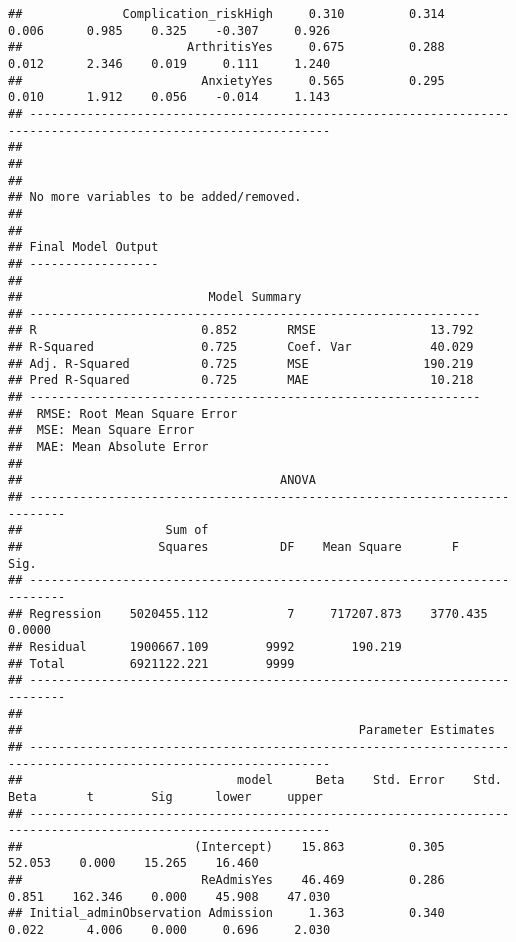 \documentclass[
]{article}
\begin{document}
\begin{verbatim}
##              Complication_riskHigh     0.310         0.314        0.006      0.985    0.325    -0.307     0.926 
##                       ArthritisYes     0.675         0.288        0.012      2.346    0.019     0.111     1.240 
##                         AnxietyYes     0.565         0.295        0.010      1.912    0.056    -0.014     1.143 
## ----------------------------------------------------------------------------------------------------------------
## 
## 
## 
## No more variables to be added/removed.
## 
## 
## Final Model Output 
## ------------------
## 
##                          Model Summary                          
## ---------------------------------------------------------------
## R                       0.852       RMSE                13.792 
## R-Squared               0.725       Coef. Var           40.029 
## Adj. R-Squared          0.725       MSE                190.219 
## Pred R-Squared          0.725       MAE                 10.218 
## ---------------------------------------------------------------
##  RMSE: Root Mean Square Error 
##  MSE: Mean Square Error 
##  MAE: Mean Absolute Error 
## 
##                                    ANOVA                                    
## ---------------------------------------------------------------------------
##                    Sum of                                                  
##                   Squares          DF    Mean Square       F          Sig. 
## ---------------------------------------------------------------------------
## Regression    5020455.112           7     717207.873    3770.435    0.0000 
## Residual      1900667.109        9992        190.219                       
## Total         6921122.221        9999                                      
## ---------------------------------------------------------------------------
## 
##                                               Parameter Estimates                                                
## ----------------------------------------------------------------------------------------------------------------
##                              model      Beta    Std. Error    Std. Beta       t        Sig      lower     upper 
## ----------------------------------------------------------------------------------------------------------------
##                        (Intercept)    15.863         0.305                  52.053    0.000    15.265    16.460 
##                         ReAdmisYes    46.469         0.286        0.851    162.346    0.000    45.908    47.030 
## Initial_adminObservation Admission     1.363         0.340        0.022      4.006    0.000     0.696     2.030 

\end{verbatim}
\end{document}
